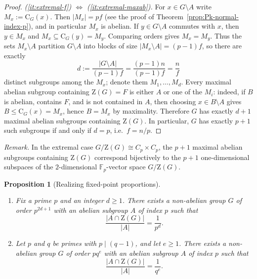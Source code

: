\documentclass[11pt]{article}
\newtheorem{proposition}[theorem]{Proposition}
\theoremstyle{definition}
\theoremstyle{remark}
\theoremstyle{definition}
\theoremstyle{plain}
\newcommand{\Z}{\mathrm{Z}}
\newcommand{\C}{\mathrm{C}}
\begin{document}
\begin{proof}
\smallskip
\noindent\emph{(\ref{it:extremal-f}) $\Longleftrightarrow$ (\ref{it:extremal-maxab}).}
For $x\in G\setminus A$ write $M_x:=\C_G(x)$.
Then $|M_x|=pf$ (see the proof of Theorem~\ref{prop:Pk-normal-index-p}), and in particular $M_x$ is abelian.
If $y\in G\setminus A$ commutes with $x$, then $y\in M_x$ and $M_x\subseteq \C_G(y)=M_y$.
Comparing orders gives $M_x=M_y$.
Thus the sets $M_x\setminus A$ partition $G\setminus A$ into blocks of size $|M_x\setminus A|=(p-1)f$,
so there are exactly
\[
d:=\frac{|G\setminus A|}{(p-1)f}=\frac{(p-1)n}{(p-1)f}=\frac{n}{f}
\]
distinct subgroups among the $M_x$; denote them $M_1,\dots,M_d$.
Every maximal abelian subgroup containing $\Z(G)=F$ is either $A$ or one of the $M_i$:
indeed, if $B$ is abelian, contains $F$, and is not contained in $A$, then choosing $x\in B\setminus A$ gives
$B\le \C_G(x)=M_x$, hence $B=M_x$ by maximality.
Therefore $G$ has exactly $d+1$ maximal abelian subgroups containing $\Z(G)$.
In particular, $G$ has exactly $p+1$ such subgroups if and only if $d=p$, i.e.\ $f=n/p$.
\end{proof}

\medskip
\noindent\textit{Remark.}
In the extremal case $G/\Z(G)\cong C_p\times C_p$, the $p+1$ maximal abelian subgroups containing $\Z(G)$ correspond bijectively to the $p+1$ one-dimensional subspaces of the $2$-dimensional $\mathbb{F}_p$-vector space $G/\Z(G)$.
\medskip

\begin{proposition}[Realizing fixed-point proportions]\label{prop:alpha-realize}
\begin{enumerate}
\item Fix a prime $p$ and an integer $d\ge 1$.
There exists a non-abelian group $G$ of order $p^{2d+1}$ with an abelian subgroup $A$ of index $p$ such that
\[
\frac{|A\cap \Z(G)|}{|A|}=\frac{1}{p^d}.
\]
\item Let $p$ and $q$ be primes with $p\mid (q-1)$, and let $e\ge 1$.
There exists a non-abelian group $G$ of order $pq^e$ with an abelian subgroup $A$ of index $p$ such that
\[
\frac{|A\cap \Z(G)|}{|A|}=\frac{1}{q^e}.
\]
\end{enumerate}
\end{proposition}
\end{document}
